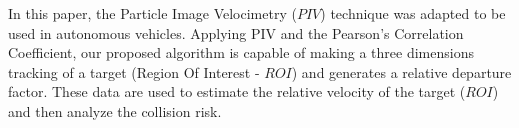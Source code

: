 In this paper, the Particle Image Velocimetry ($PIV$) technique was adapted to be used in autonomous vehicles.
Applying PIV and the Pearson’s Correlation Coefficient, our proposed algorithm 
is capable of making a three dimensions tracking of a target (Region Of Interest - $ROI$) 
and generates a relative departure factor. These data are used to estimate the 
relative velocity of the target ($ROI$) and then analyze the collision risk.